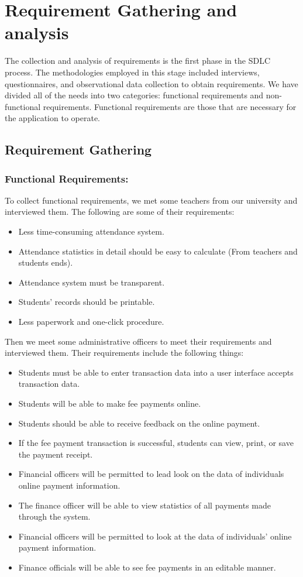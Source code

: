\section{Requirement Gathering and analysis}\label{sec:rga}
The collection and analysis of requirements is the first phase in the SDLC process. The methodologies employed in this stage included interviews, questionnaires, and observational data collection to obtain requirements. We have divided all of the needs into two categories: functional requirements and non-functional requirements. Functional requirements are those that are necessary for the application to operate.
\subsection{Requirement Gathering}\label{sub:reqgather}
\subsubsection{Functional Requirements:}\label{subsub:funreq}
To collect functional requirements, we met some teachers from our university and interviewed them. The following are some of their requirements:
\begin{itemize}
	\item Less time-consuming attendance system.
	\item Attendance statistics in detail  should be easy to calculate (From teachers and students ends).
	\item Attendance system must be transparent.
	\item Students' records should be printable.
	\item Less paperwork and one-click procedure.
\end{itemize}
Then we meet some administrative officers to meet their requirements and interviewed them. Their requirements include the following things:
\begin{itemize}
	\item Students must be able to enter transaction data into a user interface accepts transaction data.
	\item Students will be able to make fee payments online.
	\item Students should be able to receive feedback on the  online payment.
	\item If the fee payment transaction is successful, students can view, print, or save the payment receipt.
	\item Financial officers will be permitted to lead look on the data of individuals online payment information.
	\item The finance officer will be able to view statistics of all payments made through the system.
	\item Financial officers will be permitted to look at the data of individuals' online payment information.
	\item Finance officials will be able to see fee payments in an editable manner.
\end{itemize}
